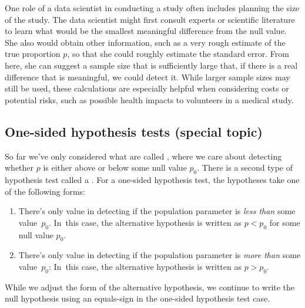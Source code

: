
One role of a data scientist in conducting a study often
includes planning the size of the study.
The data scientist might first consult experts or scientific
literature to learn what would be the smallest meaningful
difference from the null value.
She also would obtain other information,
such as a very rough estimate of the true proportion $p$,
so that she could roughly estimate the standard error.
From here, she can suggest a sample size that is sufficiently
large that, if there is a real difference that is meaningful,
we could detect it.
While larger sample sizes may still be used,
these calculations are especially helpful when considering
costs or potential risks, such as possible health impacts
to volunteers in a medical study.


\D{\newpage}

\subsection{One-sided hypothesis tests (special topic)}

So far we've only considered what are called , where we care about detecting whether $p$
is either above or below some null value $p_0$.
There is a second type of hypothesis test called a
.
For a one-sided hypothesis test,
the hypotheses take one of the following forms:
\begin{enumerate}
\item There's only value in detecting if the population
    parameter is \emph{less than} some value~$p_0$.
    In~this case, the alternative hypothesis is written
    as $p < p_0$ for some null value $p_0$.
\item There's only value in detecting if the population
    parameter is \emph{more than} some value~$p_0$:
    In~this case, the alternative hypothesis is written
    as $p > p_0$.
\end{enumerate}
While we adjust the form of the alternative hypothesis,
we continue to write the null hypothesis using an equals-sign
in the one-sided hypothesis test case.

